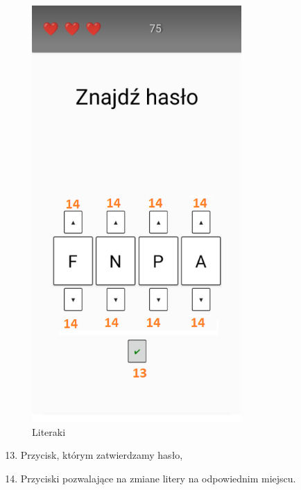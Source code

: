 	\begin{figure}[!htb]
	\begin{center}
		\includegraphics[width=8cm]{rys/opis6.png}
		\caption{Literaki}
		\label{rys:rysunek001}
	\end{center}
\end{figure}

\begin{enumerate}
	\setcounter{enumi}{12}
	\item Przycisk, którym zatwierdzamy hasło,
	\item Przyciski pozwalające na zmiane litery na odpowiednim miejscu.
\end{enumerate}

